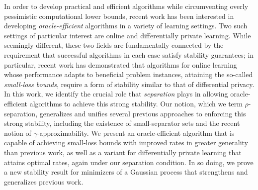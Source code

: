
In order to develop practical and efficient algorithms while circumventing overly pessimistic computational lower bounds, recent work has been interested in developing \emph{oracle-efficient} algorithms in a variety of learning settings.  Two such settings of particular interest are online and differentially private learning.
While seemingly different, these two fields are fundamentally connected by the requirement that successful algorithms in each case satisfy stability guarantees; in particular, recent work has demonstrated that algorithms for online learning whose performance adapts to beneficial problem instances, attaining the so-called \emph{small-loss bounds}, require a form of stability similar to that of differential privacy.  In this work, we identify the crucial role that \emph{separation} plays in allowing oracle-efficient algorithms to achieve this strong stability.  Our notion, which we term $\rho$-separation, generalizes and unifies several previous approaches to enforcing this strong stability, including the existence of small-separator sets and the recent notion of $\gamma$-approximability.  We present an oracle-efficient algorithm that is capable of achieving small-loss bounds with improved rates in greater generality than previous work, as well as a variant for differentially private learning that attains optimal rates, again under our separation condition.  In so doing, we prove a new stability result for minimizers of a Gaussian process that strengthens and generalizes previous work. 
